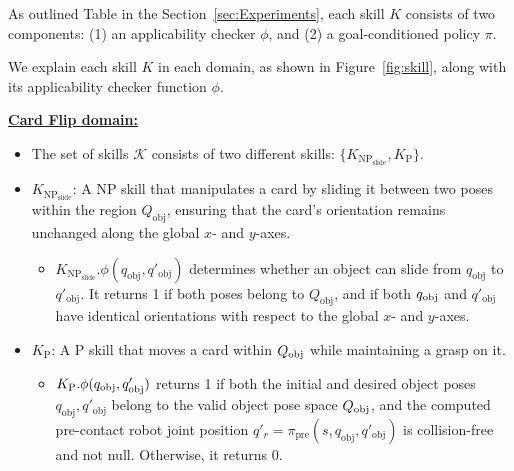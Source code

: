 
As outlined Table  in the Section~\ref{sec:Experiments}, each skill $K$ consists of two components: (1) an applicability checker $\phi$, and (2) a goal-conditioned policy $\pi$.

We explain each skill \( K \) in each domain, as shown in Figure~\ref{fig:skill}, along with its applicability checker function \( \phi \).

\underline{\textbf{Card Flip domain:}} \label{env:card_flip_skill_descript}
\begin{itemize}
        \item[] The set of skills \(\mathcal{K}\) consists of two different skills: \(\{ K_{\text{NP}_\text{slide}}, K_\text{P}\}\). \label{skill:card_flip_library}
        \item \(K_{\text{NP}_\text{slide}}\): A NP skill that manipulates a card by sliding it between two poses within the region \(Q_\text{obj}\), ensuring that the card's orientation remains unchanged along the global \( x \)- and \( y \)-axes. \label{skill:card_flip_slide}
        \begin{itemize}
            \item \( K_{\text{NP}_\text{slide}}.\phi(q_{\text{obj}}, q'_{\text{obj}}) \) determines whether an object can slide from \( q_{\text{obj}} \) to \( q'_{\text{obj}} \). It returns 1 if both poses belong to \( Q_{\text{obj}} \), and if both $q_\text{obj}$ and $q'_\text{obj}$ have identical orientations with respect to the global \( x \)- and \( y \)-axes.
        \end{itemize}
        \item \(K_\text{P}\): A P skill that moves a card within \( Q_\text{obj} \) while maintaining a grasp on it. \label{skill:card_flip_place}
        \begin{itemize}
            \item $K_\text{P}.\phi(q_\text{obj}, q_\text{obj}')$ returns 1 if both the initial and desired object poses \( q_\text{obj}, q'_\text{obj} \) belong to the valid object pose space \( Q_\text{obj} \), and the computed pre-contact robot joint position \( q'_r = \pi_{\text{pre}}(s, q_{\text{obj}}, q'_{\text{obj}}) \) is collision-free and not null. Otherwise, it returns 0.
        \end{itemize}
\end{itemize}

